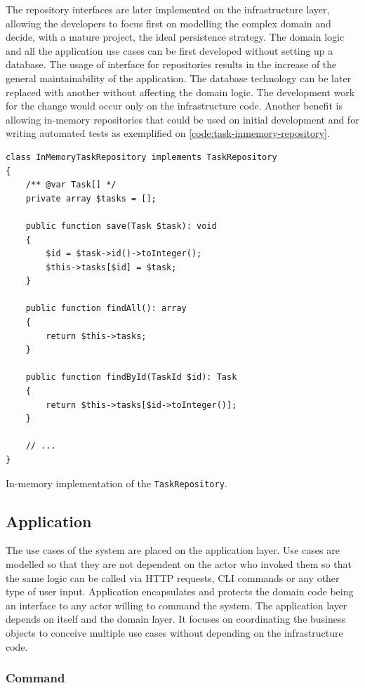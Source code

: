 The repository interfaces are later implemented on the infrastructure layer, allowing the developers to focus first on modelling the complex domain and decide, with a mature project, the ideal persistence strategy. The domain logic and all the application use cases can be first developed without setting up a database. The usage of interface for repositories results in the increase of the general maintainability of the application. The database technology can be later replaced with another without affecting the domain logic. The development work for the change would occur only on the infrastructure code. Another benefit is allowing in-memory repositories that could be used on initial development and for writing automated tests as exemplified on \autoref{code:task-inmemory-repository}.

\begin{listing}[htbp]
\begin{verbatim}
class InMemoryTaskRepository implements TaskRepository
{
	/** @var Task[] */
	private array $tasks = [];

	public function save(Task $task): void
	{
		$id = $task->id()->toInteger();
		$this->tasks[$id] = $task;
	}

	public function findAll(): array
	{
		return $this->tasks;
	}

	public function findById(TaskId $id): Task
	{
		return $this->tasks[$id->toInteger()];
	}

	// ...
}
\end{verbatim}
\caption{In-memory implementation of the \texttt{TaskRepository}.}
\label{code:task-inmemory-repository}
\end{listing}

\subsection{Application}

The use cases of the system are placed on the application layer. Use cases are modelled so that they are not dependent on the actor who invoked them so that the same logic can be called via HTTP requests, CLI commands or any other type of user input. Application encapsulates and protects the domain code being an interface to any actor willing to command the system. The application layer depends on itself and the domain layer. It focuses on coordinating the business objects to conceive multiple use cases without depending on the infrastructure code.

\subsubsection{Command}
\label{sec:command}


